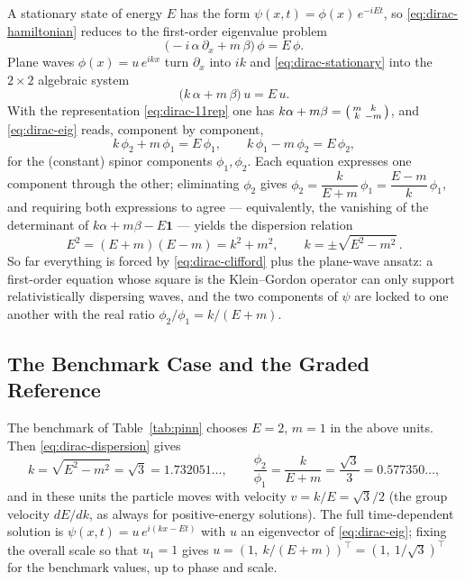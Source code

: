 A stationary state of energy $E$ has the form
$\psi(x,t) = \phi(x)\, e^{-iEt}$, so \eqref{eq:dirac-hamiltonian} reduces to
the first-order eigenvalue problem
\begin{equation}
\bigl(-i\,\alpha\,\partial_x + m\,\beta\bigr)\,\phi = E\,\phi .
\label{eq:dirac-stationary}
\end{equation}
Plane waves $\phi(x) = u\, e^{ikx}$ turn $\partial_x$ into $ik$ and
\eqref{eq:dirac-stationary} into the $2 \times 2$ algebraic system
\begin{equation}
\bigl(k\,\alpha + m\,\beta\bigr)\, u = E\, u .
\label{eq:dirac-eig}
\end{equation}
With the representation \eqref{eq:dirac-11rep} one has
$k\alpha + m\beta = \begin{psmallmatrix} m & k \\ k & -m \end{psmallmatrix}$,
and \eqref{eq:dirac-eig} reads, component by component,
\begin{equation}
k\,\phi_2 + m\,\phi_1 = E\,\phi_1,
\qquad
k\,\phi_1 - m\,\phi_2 = E\,\phi_2,
\label{eq:dirac-components}
\end{equation}
for the (constant) spinor components $\phi_1, \phi_2$. Each equation
expresses one component through the other; eliminating $\phi_2$ gives
$\phi_2 = \dfrac{k}{E+m}\,\phi_1 = \dfrac{E-m}{k}\,\phi_1$, and requiring
both expressions to agree --- equivalently, the vanishing of the determinant
of $k\alpha + m\beta - E\mathbf{1}$ --- yields the dispersion relation
\begin{equation}
E^{2} = (E+m)(E-m) = k^{2} + m^{2},
\qquad
k = \pm\sqrt{E^{2} - m^{2}}\,.
\label{eq:dirac-dispersion}
\end{equation}
So far everything is forced by \eqref{eq:dirac-clifford} plus the plane-wave
ansatz: a first-order equation whose square is the Klein--Gordon operator can
only support relativistically dispersing waves, and the two
components of $\psi$ are locked to one another with the real ratio
$\phi_2/\phi_1 = k/(E+m)$.

\subsection{The Benchmark Case and the Graded Reference}
\label{sec:dirac-benchmark}

The benchmark of Table~\ref{tab:pinn} chooses $E = 2$, $m = 1$ in the above
units. Then \eqref{eq:dirac-dispersion} gives
\begin{equation}
k = \sqrt{E^{2} - m^{2}} = \sqrt{3} = 1.732051\ldots,
\qquad
\frac{\phi_2}{\phi_1} = \frac{k}{E+m} = \frac{\sqrt{3}}{3}
= 0.577350\ldots,
\label{eq:dirac-benchmark}
\end{equation}
and in these units the particle moves with velocity $v = k/E = \sqrt{3}/2$
(the group velocity $dE/dk$, as always for positive-energy solutions). The
full time-dependent solution is
$\psi(x,t) = u\, e^{i(kx - Et)}$ with $u$ an eigenvector of
\eqref{eq:dirac-eig}; fixing the overall scale so that $u_1 = 1$ gives
$u = (1,\ k/(E+m))^{\top} = (1,\ 1/\sqrt{3})^{\top}$ for the benchmark
values, up to phase and scale.

